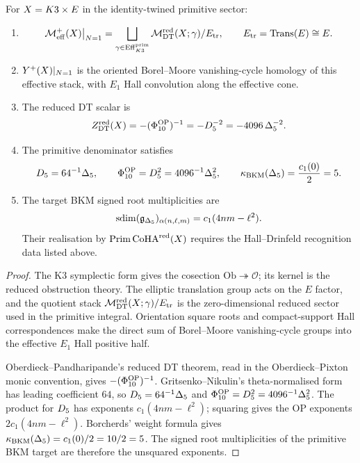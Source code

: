 \begin{theorem}[\(N=1\) effective positive half and scalar test]
\label{thm:n1-effective-positive-half}
For \(X=K3\times E\) in the identity-twined primitive sector:
\begin{enumerate}
\item
\[
  \mathcal{M}^{+}_{\mathrm{eff}}(X)\big|_{N=1}
  =
  \bigsqcup_{\gamma\in\mathrm{Eff}^{\mathrm{prim}}_{K3}}
  \mathcal{M}^{\mathrm{red}}_{\mathrm{DT}}(X;\gamma)/E_{\mathrm{tr}},
  \qquad
  E_{\mathrm{tr}}=\mathrm{Trans}(E)\cong E .
\]
\item
\(Y^{+}(X)|_{N=1}\) is the oriented Borel--Moore
vanishing-cycle homology of this effective stack, with \(E_1\) Hall
convolution along the effective cone.
\item
The reduced DT scalar is
\[
  Z^{\mathrm{red}}_{\mathrm{DT}}(X)
  =
  -(\Phi_{10}^{\mathrm{OP}})^{-1}
  =
  -D_{5}^{-2}
  =
  -4096\,\Delta_{5}^{-2}.
\]
\item
The primitive denominator satisfies
\[
  D_{5}=64^{-1}\Delta_{5},\qquad
  \Phi_{10}^{\mathrm{OP}}=D_{5}^2=4096^{-1}\Delta_{5}^2,\qquad
  \kappa_{\mathrm{BKM}}(\Delta_{5})=\frac{c_1(0)}{2}=5.
\]
\item
The target BKM signed root multiplicities are
\[
  \operatorname{sdim}(\mathfrak{g}_{\Delta_{5}})_{\alpha(n,\ell,m)}
  =
  c_1(4nm-\ell^2).
\]
Their realisation by \(\operatorname{Prim}\mathrm{CoHA}^{\mathrm{red}}(X)\) requires the
Hall--Drinfeld recognition data listed above.
\end{enumerate}
\end{theorem}

\begin{proof}
The K3 symplectic form gives the cosection
\(\mathrm{Ob}\twoheadrightarrow\mathcal O\); its kernel is the reduced
obstruction theory. The elliptic translation group acts on the \(E\)
factor, and the quotient stack \(\mathcal{M}^{\mathrm{red}}_{\mathrm{DT}}(X;\gamma)/E_{\mathrm{tr}}\) is the
zero-dimensional reduced sector used in the primitive integral.
Orientation square roots and compact-support Hall correspondences make
the direct sum of Borel--Moore vanishing-cycle groups into the
effective \(E_1\) Hall positive half.

Oberdieck--Pandharipande's reduced DT theorem, read in the
Oberdieck--Pixton monic convention, gives
\(-(\Phi_{10}^{\mathrm{OP}})^{-1}\). Gritsenko--Nikulin's theta-normalised form has
leading coefficient \(64\), so \(D_{5}=64^{-1}\Delta_{5}\) and
\(\Phi_{10}^{\mathrm{OP}}=D_{5}^2=4096^{-1}\Delta_{5}^2\). The product for
\(D_{5}\) has exponents \(c_1(4nm-\ell^2)\); squaring gives the OP
exponents \(2c_1(4nm-\ell^2)\). Borcherds' weight formula gives
\(\kappa_{\mathrm{BKM}}(\Delta_{5})=c_1(0)/2=10/2=5\). The signed root multiplicities
of the primitive BKM target are therefore the unsquared exponents.
\end{proof}

